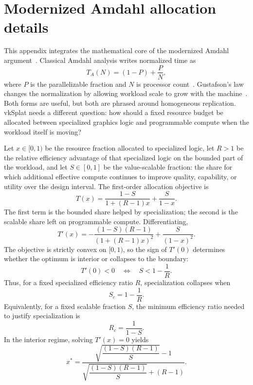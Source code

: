 \documentclass[10pt,journal]{IEEEtran}
\begin{document}
\appendices
\section{Modernized Amdahl allocation details}
\label{app:amdahl}

This appendix integrates the mathematical core of the modernized Amdahl
argument~\cite{lu2026amdahl}.  Classical Amdahl analysis writes
normalized time as
\begin{equation}
  T_A(N) = (1-P) + \frac{P}{N},
  \label{eq:appendix-amdahl}
\end{equation}
where $P$ is the parallelizable fraction and $N$ is processor
count~\cite{amdahl1967}.  Gustafson's law changes the normalization by
allowing workload scale to grow with the machine~\cite{gustafson1988}.
Both forms are useful, but both are phrased around homogeneous
replication.  vkSplat needs a different question: how should a fixed
resource budget be allocated between specialized graphics logic and
programmable compute when the workload itself is moving?

Let $x \in [0,1)$ be the resource fraction allocated to specialized
logic, let $R>1$ be the relative efficiency advantage of that specialized
logic on the bounded part of the workload, and let $S \in [0,1]$ be the
value-scalable fraction: the share for which additional effective
compute continues to improve quality, capability, or utility over the
design interval.  The first-order allocation objective is
\begin{equation}
  T(x) =
  \frac{1-S}{1+(R-1)x} + \frac{S}{1-x}.
  \label{eq:appendix-allocation}
\end{equation}
The first term is the bounded share helped by specialization; the second
is the scalable share left on programmable compute.  Differentiating,
\begin{equation}
  T'(x)
  =
  -\frac{(1-S)(R-1)}{\left(1+(R-1)x\right)^2}
  + \frac{S}{(1-x)^2}.
  \label{eq:appendix-derivative}
\end{equation}
The objective is strictly convex on $[0,1)$, so the sign of $T'(0)$
determines whether the optimum is interior or collapses to the boundary:
\begin{equation}
  T'(0) < 0
  \quad\Longleftrightarrow\quad
  S < 1 - \frac{1}{R}.
  \label{eq:appendix-threshold}
\end{equation}
Thus, for a fixed specialized efficiency ratio $R$, specialization
collapses when
\begin{equation}
  S_c = 1 - \frac{1}{R}.
  \label{eq:appendix-sc}
\end{equation}
Equivalently, for a fixed scalable fraction $S$, the minimum efficiency
ratio needed to justify specialization is
\begin{equation}
  R_c = \frac{1}{1-S}.
  \label{eq:appendix-rc}
\end{equation}
In the interior regime, solving $T'(x)=0$ yields
\begin{equation}
  x^*
  =
  \frac{\sqrt{\dfrac{(1-S)(R-1)}{S}} - 1}
       {\sqrt{\dfrac{(1-S)(R-1)}{S}} + (R-1)}.
  \label{eq:appendix-optimum}
\end{equation}
\end{document}
